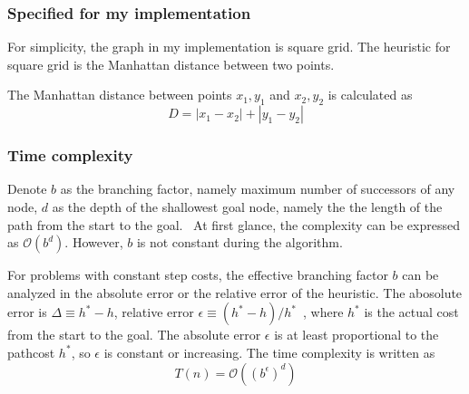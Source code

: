 \documentclass[catalog.tex]{subfiles}
\begin{document}
\subsubsection*{Specified for my implementation}
\par For simplicity, the graph in my implementation is square grid. The heuristic for square grid is the Manhattan distance between two points.~\cite{stanford}
\par The Manhattan distance between points $x_1,y_1$ and $x_2,y_2$ is calculated as
$$
	D=|x_1-x_2|+|y_1-y_2|
$$
\subsubsection*{Time complexity}
\par Denote $b$ as the branching factor, namely maximum number of successors of any node, $d$ as the depth of the shallowest goal
node, namely the the length of the path from the start to the goal.~\cite{def} At first glance, the complexity can be expressed as $\mathcal{O}(b^d)$. However, $b$ is not constant during the algorithm.
\par For problems with constant step costs, the effective branching factor $b$ can be analyzed in the absolute error or the relative error of the heuristic. The abosolute error is $\Delta \equiv h^*-h$, relative error $\epsilon \equiv (h^*-h)/h^*$~\cite{time}, where $h^*$ is the actual cost from the start to the goal. The absolute error $\epsilon$ is at least proportional to the pathcost $h^*$, so $\epsilon$ is constant or increasing. The time complexity is written as
$$
	T(n)= \mathcal{O}((b^{\epsilon})^d)
$$
\newpage
\end{document}
